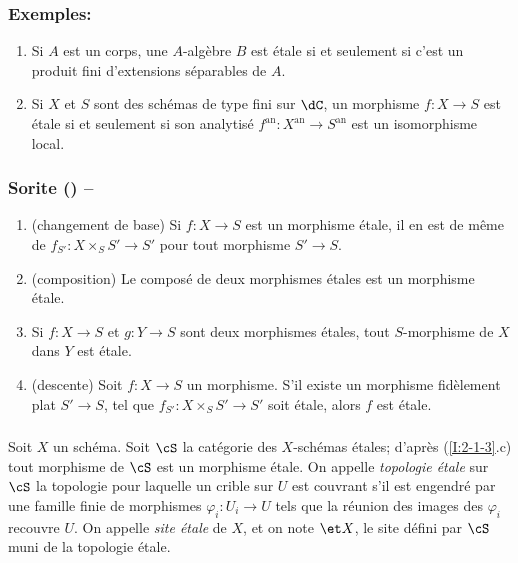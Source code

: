\subsubsection{Exemples:}\label{I:2-1-2}
\begin{enumerate}[\indent a)]
  \item Si $A$ est un corps, une $A$-algèbre $B$ est étale si et seulement 
    si c'est un produit fini d'extensions séparables de $A$. 
  \item Si $X$ et $S$ sont des schémas de type fini sur $\dC$, un morphisme 
    $f:X\to S$ est étale si et seulement si son analytisé 
    $f^{\text{an}}:X^{\text{an}}\to S^{\text{an}}$ est un isomorphisme local.
\end{enumerate}





\label{I:2-1-3}
\subsubsection*{Sorite (\thesubsubsection) --}
\begin{enumerate}[\indent a)]
  \item (changement de base) Si $f:X\to S$ est un morphisme étale, il en est 
    de même de $f_{S'}:X\times_S S'\to S'$ pour tout morphisme $S'\to S$. 
  \item (composition) Le composé de deux morphismes étales est un morphisme étale.
  \item Si $f:X\to S$ et $g:Y\to S$ sont deux morphismes étales, tout 
    $S$-morphisme de $X$ dans $Y$ est étale.
  \item (descente) Soit $f:X\to S$ un morphisme. S'il existe un morphisme 
    fidèlement plat $S'\to S$, tel que $f_{S'}:X\times_S S'\to S'$ soit 
    étale, alors $f$ est étale.
\end{enumerate}





\subsubsection{}\label{I:2-1-4}

Soit $X$ un schéma. Soit $\cS$ la catégorie des $X$-schémas étales; 
d'après (\ref{I:2-1-3}.c) tout morphisme de $\cS$ est un morphisme étale. 
On appelle \emph{topologie étale} sur $\cS$ la topologie pour laquelle un 
crible sur $U$ est couvrant s'il est engendré par une famille finie de 
morphismes $\varphi_i:U_i\to U$ tels que la réunion des images des 
$\varphi_i$ recouvre $U$. On appelle \emph{site étale} de $X$, et on note 
$\et X$, le site défini par $\cS$ muni de la topologie étale. 










